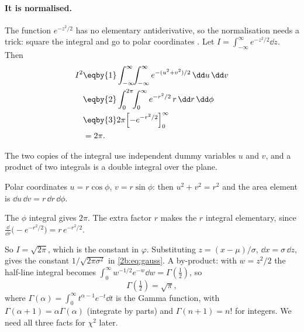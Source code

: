 \paragraph{It is normalised.} The function $e^{-z^2/2}$ has no elementary antiderivative, so the normalisation needs a trick: square the integral and go to polar coordinates . Let $I=\int_{-\infty}^{\infty}e^{-z^2/2}\dd z$. Then
\begin{align}
  I^2
  &\eqby{1} \int_{-\infty}^{\infty}\!\!\int_{-\infty}^{\infty} e^{-(u^2+v^2)/2}\,\dd u\,\dd v \nonumber\\
  &\eqby{2} \int_{0}^{2\pi}\!\!\int_{0}^{\infty} e^{-r^2/2}\,r\,\dd r\,\dd\phi \nonumber\\
  &\eqby{3} 2\pi\Bigl[-e^{-r^2/2}\Bigr]_0^{\infty} \nonumber\\
  &= 2\pi .
  \label{2b:eq:gauss-integral}
\end{align}
\begin{explain}
  \item The two copies of the integral use independent dummy variables $u$ and $v$, and a product of two integrals is a double integral over the plane.
  \item Polar coordinates $u=r\cos\phi$, $v=r\sin\phi$: then $u^2+v^2=r^2$ and the area element is $\dd u\,\dd v=r\,\dd r\,\dd\phi$.
  \item The $\phi$ integral gives $2\pi$. The extra factor $r$ makes the $r$ integral elementary, since $\frac{\dd}{\dd r}\bigl(-e^{-r^2/2}\bigr)=r\,e^{-r^2/2}$.
\end{explain}
So $I=\sqrt{2\pi}$, which is the constant in $\varphi$. Substituting $z=(x-\mu)/\sigma$, $\dd x=\sigma\,\dd z$, gives the constant $1/\sqrt{2\pi\sigma^2}$ in \eqref{2b:eq:gauss}. A by-product: with $w=z^2/2$ the half-line integral becomes $\int_0^\infty w^{-1/2}e^{-w}\dd w=\Gamma(\tfrac12)$, so
\begin{equation}
  \Gamma(\tfrac12)=\sqrt\pi ,
  \label{2b:eq:gamma-half}
\end{equation}
where $\Gamma(\alpha)=\int_0^\infty t^{\alpha-1}e^{-t}\dd t$ is the Gamma function, with $\Gamma(\alpha+1)=\alpha\Gamma(\alpha)$ (integrate by parts) and $\Gamma(n+1)=n!$ for integers. We need all three facts for $\chi^2$ later.

